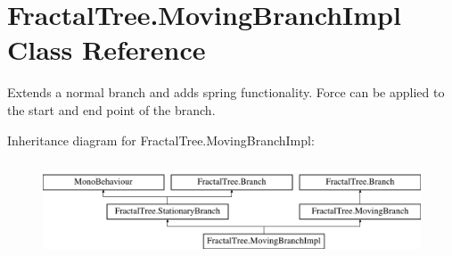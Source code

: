 \hypertarget{class_fractal_tree_1_1_moving_branch_impl}{}\section{Fractal\+Tree.\+Moving\+Branch\+Impl Class Reference}
\label{class_fractal_tree_1_1_moving_branch_impl}


Extends a normal branch and adds spring functionality. Force can be applied to the start and end point of the branch.  


Inheritance diagram for Fractal\+Tree.\+Moving\+Branch\+Impl\+:\begin{figure}[H]
\begin{center}
\leavevmode
\includegraphics[height=2.871795cm]{class_fractal_tree_1_1_moving_branch_impl}
\end{center}
\end{figure}
